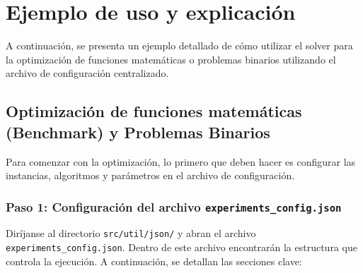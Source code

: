 \section{Ejemplo de uso y explicación}

A continuación, se presenta un ejemplo detallado de cómo utilizar el solver para la optimización de funciones matemáticas o problemas binarios utilizando el archivo de configuración centralizado.

\subsection{Optimización de funciones matemáticas (Benchmark) y Problemas Binarios}

Para comenzar con la optimización, lo primero que deben hacer es configurar las instancias, algoritmos y parámetros en el archivo de configuración.

\subsubsection{Paso 1: Configuración del archivo \texttt{experiments\_config.json}}

Diríjanse al directorio \texttt{src/util/json/} y abran el archivo \texttt{experiments\_config.json}. Dentro de este archivo encontrarán la estructura que controla la ejecución. A continuación, se detallan las secciones clave:

